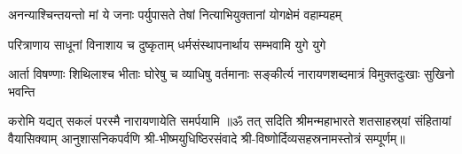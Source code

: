\twolineshloka
{अनन्याश्चिन्तयन्तो मां ये जनाः पर्युपासते}
{तेषां नित्याभियुक्तानां योगक्षेमं वहाम्यहम्}

\twolineshloka
{परित्राणाय साधूनां विनाशाय च दुष्कृताम्}
{धर्मसंस्थापनार्थाय सम्भवामि युगे युगे}

\fourlineindentedshloka
{आर्ता विषण्णाः शिथिलाश्च भीताः}
{घोरेषु च व्याधिषु वर्तमानाः}
{सङ्कीर्त्य नारायणशब्दमात्रं}
{विमुक्तदुःखाः सुखिनो भवन्ति}

{करोमि यद्यत् सकलं परस्मै नारायणायेति समर्पयामि}
॥ॐ तत् सदिति श्रीमन्महाभारते शतसाहस्र्यां संहितायां वैयासिक्याम् आनुशासनिकपर्वणि श्री-भीष्मयुधिष्ठिरसंवादे श्री-विष्णोर्दिव्यसहस्रनामस्तोत्रं सम्पूर्णम्॥
\setlength{\shlokaspaceskip}{24pt}
